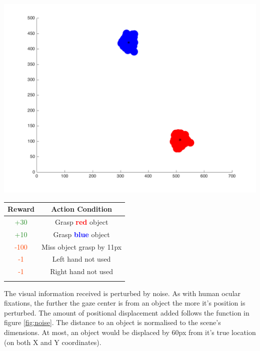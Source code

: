 \documentclass[11]{article}
\begin{document}
  \begin{minipage}[b]{0.39\textwidth}
    \includegraphics[width=1\textwidth]{Scene.png}
    \label{fig:scene}
  \end{minipage}
  \hfill
  \begin{minipage}[b]{0.60\textwidth}
    \centering
    \begin{tabular}{cc}\hline
        \textbf{Reward} & \textbf{Action Condition}\\ \hline
        
        \textcolor{ForestGreen}{+30} & Grasp \textbf{\textcolor{red}{red}} object \\
        \textcolor{ForestGreen}{+10} & Grasp \textbf{\textcolor{blue}{blue}} object \\
        \textcolor{OrangeRed}{-100} & Miss object grasp by 11px \\
        \textcolor{OrangeRed}{-1} & Left hand not used \\
        \textcolor{OrangeRed}{-1} & Right hand not used \\ \hline
        \\
        
      \end{tabular}
      \label{table:rewards}
    \end{minipage}
 
The visual information received is perturbed by noise. As with human ocular fixations, the further the gaze center is from an object the more it's position is perturbed. The amount of positional displacement added follows the function in figure \ref{fig:noise}. The distance to an object is normalised to the scene's dimensions. At most, an object would be displaced by 60px from it's true location (on both X and Y coordinates).
\end{document}
